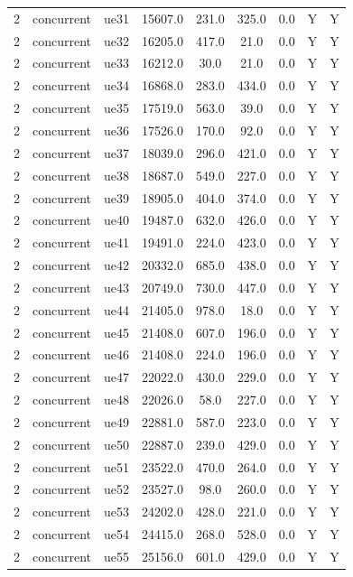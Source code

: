 \begin{table}[ht]
\begin{tabular}{|c|c|c|c|c|c|c|c|c|}
2 & concurrent & ue31 & 15607.0 & 231.0 & 325.0 & 0.0 & Y & Y \\
2 & concurrent & ue32 & 16205.0 & 417.0 & 21.0 & 0.0 & Y & Y \\
2 & concurrent & ue33 & 16212.0 & 30.0 & 21.0 & 0.0 & Y & Y \\
2 & concurrent & ue34 & 16868.0 & 283.0 & 434.0 & 0.0 & Y & Y \\
2 & concurrent & ue35 & 17519.0 & 563.0 & 39.0 & 0.0 & Y & Y \\
2 & concurrent & ue36 & 17526.0 & 170.0 & 92.0 & 0.0 & Y & Y \\
2 & concurrent & ue37 & 18039.0 & 296.0 & 421.0 & 0.0 & Y & Y \\
2 & concurrent & ue38 & 18687.0 & 549.0 & 227.0 & 0.0 & Y & Y \\
2 & concurrent & ue39 & 18905.0 & 404.0 & 374.0 & 0.0 & Y & Y \\
2 & concurrent & ue40 & 19487.0 & 632.0 & 426.0 & 0.0 & Y & Y \\
2 & concurrent & ue41 & 19491.0 & 224.0 & 423.0 & 0.0 & Y & Y \\
2 & concurrent & ue42 & 20332.0 & 685.0 & 438.0 & 0.0 & Y & Y \\
2 & concurrent & ue43 & 20749.0 & 730.0 & 447.0 & 0.0 & Y & Y \\
2 & concurrent & ue44 & 21405.0 & 978.0 & 18.0 & 0.0 & Y & Y \\
2 & concurrent & ue45 & 21408.0 & 607.0 & 196.0 & 0.0 & Y & Y \\
2 & concurrent & ue46 & 21408.0 & 224.0 & 196.0 & 0.0 & Y & Y \\
2 & concurrent & ue47 & 22022.0 & 430.0 & 229.0 & 0.0 & Y & Y \\
2 & concurrent & ue48 & 22026.0 & 58.0 & 227.0 & 0.0 & Y & Y \\
2 & concurrent & ue49 & 22881.0 & 587.0 & 223.0 & 0.0 & Y & Y \\
2 & concurrent & ue50 & 22887.0 & 239.0 & 429.0 & 0.0 & Y & Y \\
2 & concurrent & ue51 & 23522.0 & 470.0 & 264.0 & 0.0 & Y & Y \\
2 & concurrent & ue52 & 23527.0 & 98.0 & 260.0 & 0.0 & Y & Y \\
2 & concurrent & ue53 & 24202.0 & 428.0 & 221.0 & 0.0 & Y & Y \\
2 & concurrent & ue54 & 24415.0 & 268.0 & 528.0 & 0.0 & Y & Y \\
2 & concurrent & ue55 & 25156.0 & 601.0 & 429.0 & 0.0 & Y & Y \\

\end{tabular}
\end{table}
